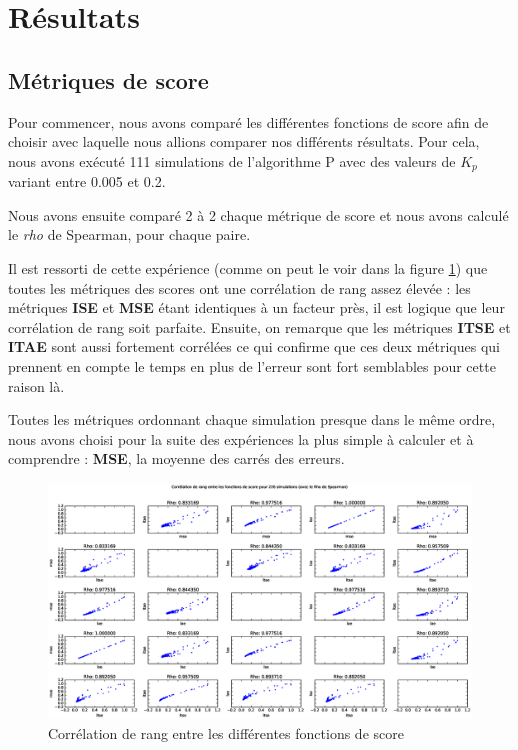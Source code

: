 \documentclass[a4paper,10pt]{report}
\begin{document}
\section{Résultats}

\subsection{Métriques de score}

Pour commencer, nous avons comparé les différentes fonctions de score afin de choisir avec laquelle nous allions comparer nos différents résultats. Pour cela, nous avons exécuté 111 simulations de l'algorithme P avec des valeurs de $K_p$ variant entre 0.005 et 0.2.

Nous avons ensuite comparé 2 à 2 chaque métrique de score et nous avons calculé le \textit{rho} de Spearman, pour chaque paire.

Il est ressorti de cette expérience (comme on peut le voir dans la figure \ref{fig:correlation}) que toutes les métriques des scores ont une corrélation de rang assez élevée :
les métriques \textbf{ISE} et \textbf{MSE} étant identiques à un facteur près, il est logique que leur corrélation de rang soit parfaite.
Ensuite, on remarque que les métriques \textbf{ITSE} et \textbf{ITAE} sont aussi fortement corrélées ce qui confirme que ces deux métriques qui prennent en compte le temps en plus de l'erreur sont fort semblables pour cette raison là.

Toutes les métriques ordonnant chaque simulation presque dans le même ordre,
nous avons choisi pour la suite des expériences la plus simple à calculer et à comprendre :
\textbf{MSE}, la moyenne des carrés des erreurs.

\begin{figure}[hb!]
   \centering
   \includegraphics[scale=0.35]{correlation.eps}
   \caption{\label{fig:correlation} Corrélation de rang entre les différentes fonctions de score}
\end{figure}
\end{document}
